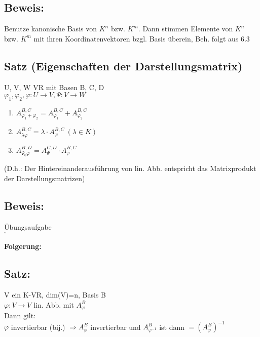 \subsection*{Beweis:}
Benutze kanonische Basis von $K^n$ bzw. $K^m$. Dann stimmen Elemente von $K^n$ bzw. $K^m$ mit ihren Koordinatenvektoren bzgl. Basis überein, Beh. folgt aus 6.3

\subsection{Satz (Eigenschaften der Darstellungsmatrix)}
U, V, W VR mit Basen B, C, D\\
$\varphi_1,\varphi_2,\varphi: U\rightarrow V, \Psi: V\rightarrow W$
\begin{enumerate}
	\item
	$A_{\varphi_1+\varphi_2}^{B,C} = A_{\varphi_1}^{B,C} + A_{\varphi_2}^{B,C}$
	
	\item
	$A_{\lambda \varphi}^{B,C} = \lambda\cdot A_{\varphi}^{B,C} \ (\lambda\in K)$
	
	\item
	$A_{\Psi_0\varphi}^{B,D} = A_{\Psi}^{C,D}\cdot A_{\varphi}^{B,C}$
\end{enumerate}
(D.h.: Der Hintereinanderausführung von lin. Abb. entspricht das Matrixprodukt der Darstellungsmatrizen)

\subsection*{Beweis:}
Übungsaufgabe\\
\hspace*{13cm}$\square$


\textbf{Folgerung:}
\subsection{Satz:}
V ein K-VR, dim(V)=n, Basis B\\
$\varphi: V\rightarrow V$ lin. Abb. mit $A_{\varphi}^B$\\
Dann gilt:\\
$\varphi$ invertierbar (bij.) $\Rightarrow A_{\varphi}^B$ invertierbar und $A_{\varphi^{-1}}^B$ ist dann $=(A_{\varphi}^B)^{-1}$

